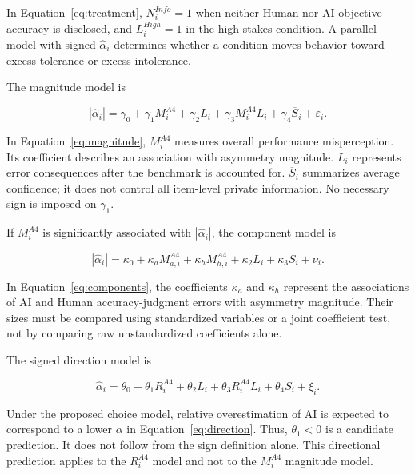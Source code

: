\documentclass[11pt,a4paper]{article}
\begin{document}
In Equation~\ref{eq:treatment}, $N_i^{Info}=1$ when neither Human nor AI objective accuracy is disclosed, and $L_i^{High}=1$ in the high-stakes condition. A parallel model with signed $\widehat\alpha_i$ determines whether a condition moves behavior toward excess tolerance or excess intolerance.

The magnitude model is

\begin{equation}
|\widehat\alpha_i|
=\gamma_0+\gamma_1M_i^{A4}+\gamma_2L_i
+\gamma_3M_i^{A4}L_i+\gamma_4\overline S_i+\varepsilon_i.
\label{eq:magnitude}
\end{equation}

In Equation~\ref{eq:magnitude}, $M_i^{A4}$ measures overall performance misperception. Its coefficient describes an association with asymmetry magnitude. $L_i$ represents error consequences after the benchmark is accounted for. $\overline S_i$ summarizes average confidence; it does not control all item-level private information. No necessary sign is imposed on $\gamma_1$.

If $M_i^{A4}$ is significantly associated with $|\widehat\alpha_i|$, the component model is

\begin{equation}
|\widehat\alpha_i|
=\kappa_0+\kappa_aM_{a,i}^{A4}+\kappa_hM_{h,i}^{A4}
+\kappa_2L_i+\kappa_3\overline S_i+\nu_i.
\label{eq:components}
\end{equation}

In Equation~\ref{eq:components}, the coefficients $\kappa_a$ and $\kappa_h$ represent the associations of AI and Human accuracy-judgment errors with asymmetry magnitude. Their sizes must be compared using standardized variables or a joint coefficient test, not by comparing raw unstandardized coefficients alone.

The signed direction model is

\begin{equation}
\widehat\alpha_i
=\theta_0+\theta_1R_i^{A4}+\theta_2L_i
+\theta_3R_i^{A4}L_i+\theta_4\overline S_i+\xi_i.
\label{eq:direction}
\end{equation}

Under the proposed choice model, relative overestimation of AI is expected to correspond to a lower $\alpha$ in Equation~\ref{eq:direction}. Thus, $\theta_1<0$ is a candidate prediction. It does not follow from the sign definition alone. This directional prediction applies to the $R_i^{A4}$ model and not to the $M_i^{A4}$ magnitude model.
\end{document}

